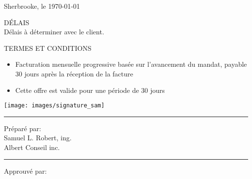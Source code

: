 \documentclass[12pt, letterpaper]{letter}
\begin{document}
\pagestyle{logo}
\begin{flushleft}

Sherbrooke, le \today \\
\vspace{0.5cm}

\end{flushleft}
\vspace{1cm}


\par


\par
\begin{samepage}

\end{samepage}

\par
DÉLAIS \\
Délais à déterminer avec le client.

\par
TERMES ET CONDITIONS
\begin{itemize}
    \item[\textbullet] Facturation mensuelle progressive basée sur l'avancement du mandat, payable 30 jours après la réception de la facture
    \item[\textbullet] Cette offre est valide pour une période de 30 jours
\end{itemize}

\begin{flushleft}
\noindent 
\parbox[b]{0.45\linewidth}{%
    \strut 
    \begin{center}
    \texttt{[image: images/signature\_sam]}
    \end{center}
    \hrule\vspace{0.5cm}
    Préparé par:\\
    Samuel L. Robert, ing.\\
    Albert Conseil inc.\\
} 
\hspace{0.5cm} %
\parbox[b]{0.45\linewidth}{%
    \strut 
    \vspace{1.5cm}
    \hrule\vspace{0.5cm}
    Approuvé par:\\
    }
\end{flushleft}
\par\vspace{1cm} 
\end{document}
